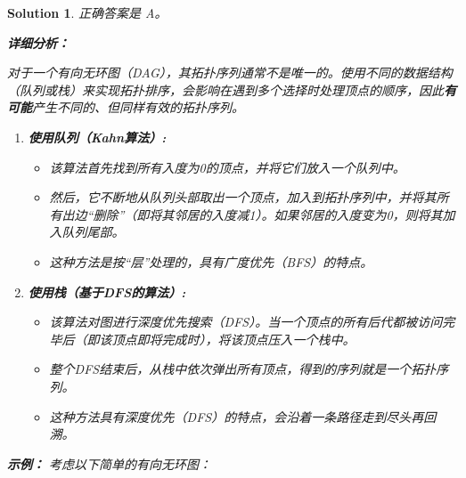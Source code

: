 \documentclass[UTF8]{report}
\newtheorem{solution}{Solution}
\theoremstyle{MyLineTheoremStyle} %
\theoremstyle{MyBlockTheoremStyle} %
\theoremstyle{MySubsubsectionStyle} %
\begin{document}
\begin{solution}
正确答案是 A。

\textbf{详细分析：}

对于一个有向无环图（DAG），其拓扑序列通常不是唯一的。使用不同的数据结构（队列或栈）来实现拓扑排序，会影响在遇到多个选择时处理顶点的顺序，因此\textbf{有可能}产生不同的、但同样有效的拓扑序列。

\begin{enumerate}
    \item \textbf{使用队列（Kahn算法）:}
    \begin{itemize}
        \item 该算法首先找到所有入度为0的顶点，并将它们放入一个队列中。
        \item 然后，它不断地从队列头部取出一个顶点，加入到拓扑序列中，并将其所有出边“删除”（即将其邻居的入度减1）。如果邻居的入度变为0，则将其加入队列尾部。
        \item 这种方法是按“层”处理的，具有广度优先（BFS）的特点。
    \end{itemize}

    \item \textbf{使用栈（基于DFS的算法）:}
    \begin{itemize}
        \item 该算法对图进行深度优先搜索（DFS）。当一个顶点的所有后代都被访问完毕后（即该顶点即将完成时），将该顶点压入一个栈中。
        \item 整个DFS结束后，从栈中依次弹出所有顶点，得到的序列就是一个拓扑序列。
        \item 这种方法具有深度优先（DFS）的特点，会沿着一条路径走到尽头再回溯。
    \end{itemize}
\end{enumerate}

\textbf{示例：}
考虑以下简单的有向无环图：
\begin{center}
\end{center}


\end{solution}
\end{document}
